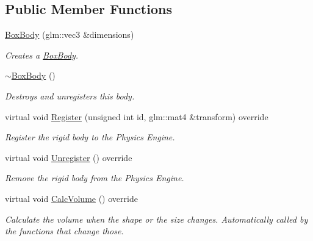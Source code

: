 \subsection*{Public Member Functions}
\begin{DoxyCompactItemize}
\item 
\hyperlink{classTarbora_1_1BoxBody_a4588faa74c221c9f484432bc3b7a0674}{Box\+Body} (glm\+::vec3 \&dimensions)
\begin{DoxyCompactList}\small\item\em Creates a \hyperlink{classTarbora_1_1BoxBody}{Box\+Body}. \end{DoxyCompactList}\item 
\mbox{\label{classTarbora_1_1BoxBody_adb0e7074d88a5e14ae8c9abca875ac52}} 
\hyperlink{classTarbora_1_1BoxBody_adb0e7074d88a5e14ae8c9abca875ac52}{$\sim$\+Box\+Body} ()
\begin{DoxyCompactList}\small\item\em Destroys and unregisters this body. \end{DoxyCompactList}\item 
virtual void \hyperlink{classTarbora_1_1BoxBody_a9030e38449087fdf091d9daea5e6efbe}{Register} (unsigned int id, glm\+::mat4 \&transform) override
\begin{DoxyCompactList}\small\item\em Register the rigid body to the Physics Engine. \end{DoxyCompactList}\item 
\mbox{\label{classTarbora_1_1BoxBody_a57a94943897a3b90f774935bef82c47c}} 
virtual void \hyperlink{classTarbora_1_1BoxBody_a57a94943897a3b90f774935bef82c47c}{Unregister} () override
\begin{DoxyCompactList}\small\item\em Remove the rigid body from the Physics Engine. \end{DoxyCompactList}\item 
\mbox{\label{classTarbora_1_1BoxBody_ab5632e04e516e518297a4826c6dd27cb}} 
virtual void \hyperlink{classTarbora_1_1BoxBody_ab5632e04e516e518297a4826c6dd27cb}{Calc\+Volume} () override
\begin{DoxyCompactList}\small\item\em Calculate the volume when the shape or the size changes. Automatically called by the functions that change those. \end{DoxyCompactList}\item 

\end{DoxyCompactItemize}
